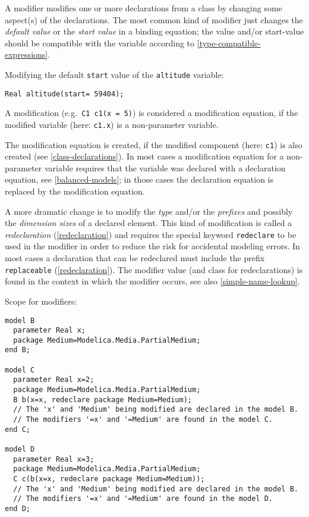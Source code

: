 A modifier modifies one or more declarations from a class by changing
some aspect(s) of the declarations. The most common kind of modifier
just changes the \emph{default value} or the \emph{start value} in a
binding equation; the value and/or start-value should be compatible with
the variable according to \cref{type-compatible-expressions}.

\begin{example}
Modifying the default \lstinline!start! value of the \lstinline!altitude! variable:
\begin{lstlisting}[language=modelica]
Real altitude(start= 59404);
\end{lstlisting}
\end{example}

A modification (e.g.\ \lstinline!C1 c1(x = 5)!) is considered a modification equation,
if the modified variable (here: \lstinline!c1.x!) is a non-parameter variable.

\begin{nonnormative}
The modification equation is created, if the modified component (here: \lstinline!c1!) is also created (see \cref{class-declarations}). In most cases
a modification equation for a non-parameter variable requires that the variable was declared with a declaration equation, see \cref{balanced-models};
in those cases the declaration equation is replaced by the modification equation.
\end{nonnormative}

A more dramatic change is to modify the \emph{type} and/or the
\emph{prefixes} and possibly the \emph{dimension sizes} of a declared
element. This kind of modification is called a \emph{redeclaration}
(\cref{redeclaration}) and requires the special keyword \lstinline!redeclare! to be used in
the modifier in order to reduce the risk for accidental modeling errors.
In most cases a declaration that can be redeclared must include the
prefix \lstinline!replaceable! (\cref{redeclaration}). The modifier value (and class for
redeclarations) is found in the context in which the modifier occurs,
see also \cref{simple-name-lookup}.

\begin{example}
Scope for modifiers:
\begin{lstlisting}[language=modelica]
model B
  parameter Real x;
  package Medium=Modelica.Media.PartialMedium;
end B;

model C
  parameter Real x=2;
  package Medium=Modelica.Media.PartialMedium;
  B b(x=x, redeclare package Medium=Medium);
  // The 'x' and 'Medium' being modified are declared in the model B.
  // The modifiers '=x' and '=Medium' are found in the model C.
end C;

model D
  parameter Real x=3;
  package Medium=Modelica.Media.PartialMedium;
  C c(b(x=x, redeclare package Medium=Medium));
  // The 'x' and 'Medium' being modified are declared in the model B.
  // The modifiers '=x' and '=Medium' are found in the model D.
end D;
\end{lstlisting}
\end{example}

